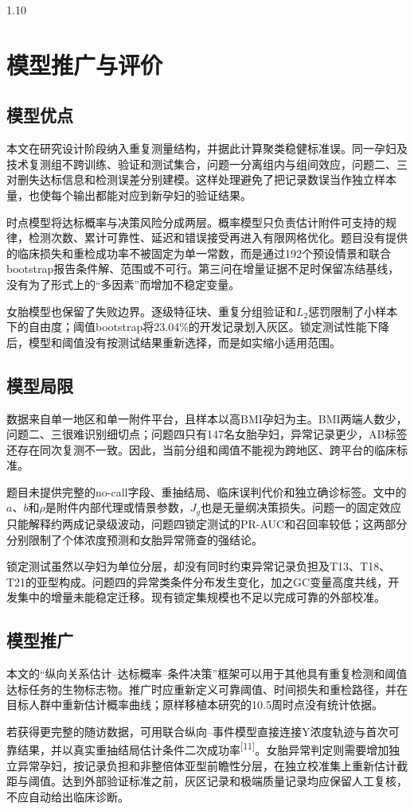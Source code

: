 \documentclass[12pt,a4paper]{ctexrep}
\numberwithin{equation}{section}
\newcommand{\citeup}[1]{\textsuperscript{[#1]}}
\begin{document}
\begin{spacing}{1.10}
{		%
			\section{模型推广与评价}
			\subsection{模型优点}
			本文在研究设计阶段纳入重复测量结构，并据此计算聚类稳健标准误。同一孕妇及技术复测组不跨训练、验证和测试集合，问题一分离组内与组间效应，问题二、三对删失达标信息和检测误差分别建模。这样处理避免了把记录数误当作独立样本量，也使每个输出都能对应到新孕妇的验证结果。

			时点模型将达标概率与决策风险分成两层。概率模型只负责估计附件可支持的规律，检测次数、累计可靠性、延迟和错误接受再进入有限网格优化。题目没有提供的临床损失和重检成功率不被固定为单一常数，而是通过192个预设情景和联合bootstrap报告条件解、范围或不可行。第三问在增量证据不足时保留冻结基线，没有为了形式上的“多因素”而增加不稳定变量。

			女胎模型也保留了失败边界。逐级特征块、重复分组验证和$L_2$惩罚限制了小样本下的自由度；阈值bootstrap将23.04\%的开发记录划入灰区。锁定测试性能下降后，模型和阈值没有按测试结果重新选择，而是如实缩小适用范围。
			\subsection{模型局限}
			数据来自单一地区和单一附件平台，且样本以高BMI孕妇为主。BMI两端人数少，问题二、三很难识别细切点；问题四只有147名女胎孕妇，异常记录更少，AB标签还存在同次复测不一致。因此，当前分组和阈值不能视为跨地区、跨平台的临床标准。

			题目未提供完整的no-call字段、重抽结局、临床误判代价和独立确诊标签。文中的$a$、$b$和$\rho$是附件内部代理或情景参数，$J_g$也是无量纲决策损失。问题一的固定效应只能解释约两成记录级波动，问题四锁定测试的PR-AUC和召回率较低；这两部分分别限制了个体浓度预测和女胎异常筛查的强结论。

			锁定测试虽然以孕妇为单位分层，却没有同时约束异常记录负担及T13、T18、T21的亚型构成。问题四的异常类条件分布发生变化，加之GC变量高度共线，开发集中的增量未能稳定迁移。现有锁定集规模也不足以完成可靠的外部校准。
			\subsection{模型推广}
			本文的“纵向关系估计--达标概率--条件决策”框架可以用于其他具有重复检测和阈值达标任务的生物标志物。推广时应重新定义可靠阈值、时间损失和重检路径，并在目标人群中重新估计概率曲线；原样移植本研究的10.5周时点没有统计依据。

			若获得更完整的随访数据，可用联合纵向--事件模型直接连接Y浓度轨迹与首次可靠结果，并以真实重抽结局估计条件二次成功率\citeup{11}。女胎异常判定则需要增加独立异常孕妇，按记录负担和非整倍体亚型前瞻性分层，在独立校准集上重新估计截距与阈值。达到外部验证标准之前，灰区记录和极端质量记录均应保留人工复核，不应自动给出临床诊断。
		}
	\end{spacing}
	
\end{document}

